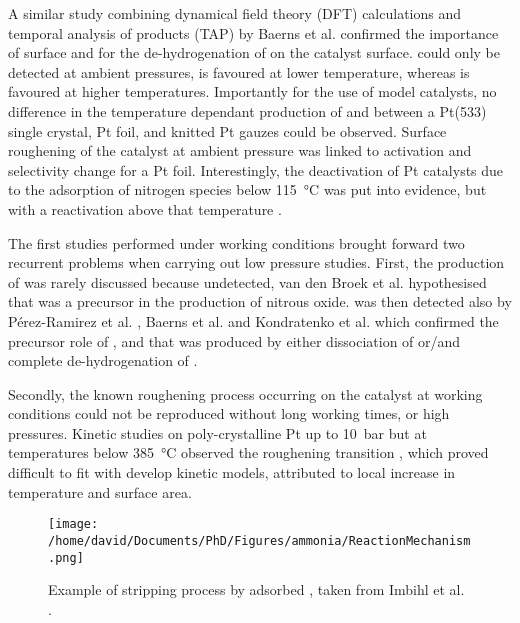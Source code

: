 A similar study combining dynamical field theory (DFT) calculations and temporal analysis of products (TAP) by Baerns et al. \parencite*{Baerns2005} confirmed the importance of surface  and  for the de-hydrogenation of  on the catalyst surface.
 could only be detected at ambient pressures,  is favoured at lower temperature, whereas  is favoured at higher temperatures.
Importantly for the use of model catalysts, no difference in the temperature dependant production of  and  between a Pt(533) single crystal, Pt foil, and knitted Pt gauzes could be observed.
Surface roughening of the catalyst at ambient pressure was linked to activation and selectivity change for a Pt foil.
Interestingly, the deactivation of Pt catalysts due to the adsorption of nitrogen species below \qty{115}{\degreeCelsius} was put into evidence, but with a reactivation above that temperature \parencite{Sobczyk2004}.

The first studies performed under working conditions brought forward two recurrent problems when carrying out low pressure studies.
First, the production of  was rarely discussed because undetected, van den Broek et al. \parencite*{vandenBroek1999} hypothesised that  was a precursor in the production of nitrous oxide.
 was then detected also by Pérez-Ramirez et al. \parencite*{PerezRamirez2004}, Baerns et al. \parencite*{Baerns2005} and Kondratenko et al. \parencite*{Kondratenko2007} which confirmed the precursor role of , and that  was produced by either dissociation of  or/and complete de-hydrogenation of .

Secondly, the known roughening process occurring on the catalyst at working conditions could not be reproduced without long working times, or high pressures.
Kinetic studies on poly-crystalline Pt up to \qty{10}{\bar} but at temperatures below \qty{385}{\degreeCelsius} observed the roughening transition \parencite{Kraehnert2008}, which proved difficult to fit with develop kinetic models, attributed to local increase in temperature and surface area.


\begin{figure}[!htb]
    \centering
    \texttt{[image: /home/david/Documents/PhD/Figures/ammonia/ReactionMechanism.png]}
    \caption{
    Example of  stripping process by adsorbed , taken from Imbihl et al. \parencite*{Imbihl2007}.
    }
    \label{fig:ReactionMechanism}
\end{figure}

